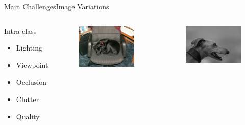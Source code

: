 \begin{frame}{Main Challenges}{Image Variations}
\begin{columns}
        \begin{block}{Intra-class}
        \begin{itemize}
            \item Lighting
            \item Viewpoint
            \item Occlusion
            \item Clutter
            \item Quality
        \end{itemize}
            

        \end{block}
        \begin{figure}
            \includegraphics[width=0.7 \textwidth]{figs/000063.jpg}
        \end{figure}
        \begin{figure}
            \includegraphics[width=0.7 \textwidth]{figs/000065.jpg}
        \end{figure}


\end{columns}
\end{frame}
